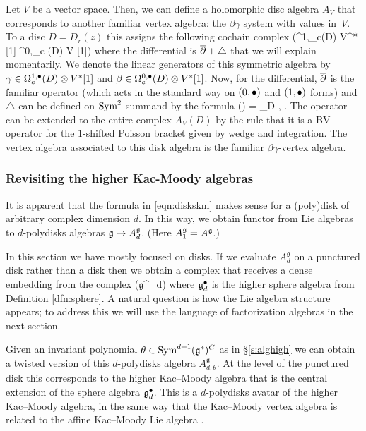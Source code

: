 \documentclass[11pt]{amsart}
\def\lie#1{\ensuremath{\mathfrak{#1}}}
\begin{document}
Let $V$ be a vector space.
Then, we can define a holomorphic disc algebra $A_V$ that corresponds to another familiar vertex algebra: the $\beta\gamma$ system with values in~$V$.
To a disc $D = D_r(z)$ this assigns the following cochain complex
\beqn
\Sym \left(\Omega^{1,\bu}_c(D) \otimes V^* [1] \oplus \Omega^{0,\bu}_c (D) \otimes V [1]\right) 
\eeqn
where the differential is ${\overline{\partial}} + \triangle$ that we will explain momentarily. 
We denote the linear generators of this symmetric algebra by $\gamma \in \Omega^{1,\bullet}_c(D) \otimes V^* [1]$ and $\beta \in \Omega^{0,\bullet}_c(D) \otimes V^* [1]$.
Now, for the differential, ${\overline{\partial}}$ is the familiar operator (which acts in the standard way on $(0,\bullet)$ and $(1,\bullet)$ forms) and $\triangle$ can be defined on $\operatorname{Sym}^2$ summand by the formula
\beqn
\triangle (\gamma \cdot \beta) = \int_D \<\gamma, \beta\> . 
\eeqn
The operator can be extended to the entire complex $A_V(D)$ by the rule that it is a BV operator for the $1$-shifted Poisson bracket given by wedge and integration.
The vertex algebra associated to this disk algebra is the familiar $\beta\gamma$-vertex algebra.

\subsubsection{Revisiting the higher Kac-Moody algebras}

It is apparent that the formula in \eqref{eqn:diskskm} makes sense for a (poly)disk of arbitrary complex dimension $d$.
In this way, we obtain functor from Lie algebras to $d$-polydisks algebras $\mathfrak g \mapsto A^{\mathfrak g}_d$.
(Here $A^{\mathfrak g}_1 = A^{\mathfrak g}$.)

In this section we have mostly focused on disks.
If we evaluate $A^{\lie{g}}_{d}$ on a punctured disk rather than a disk then we obtain a complex that receives a dense embedding from the complex
\beqn
\Sym \left(\lie{g}^\bu_{d}\right) 
\eeqn
where $\lie{g}^\bu_d$ is the higher sphere algebra from Definition \ref{dfn:sphere}.
A natural question is how the Lie algebra structure appears; to address this we will use the language of factorization algebras in the next section.

Given an invariant polynomial $\theta \in \Sym^{d+1}(\lie{g}^*)^G$ as in \S \ref{s:alghigh} we can obtain a twisted version of this $d$-polydisks algebra $A^{\lie{g}}_{d,\theta}$.
At the level of the punctured disk this corresponds to the higher Kac--Moody algebra that is the central extension of the sphere algebra $\lie{\fg}^\bu_{d}$.
This is a $d$-polydisks avatar of the higher Kac--Moody algebra, in the same way that the Kac--Moody vertex algebra is related to the affine Kac--Moody Lie algebra \cite{GWkm}.
\end{document}
